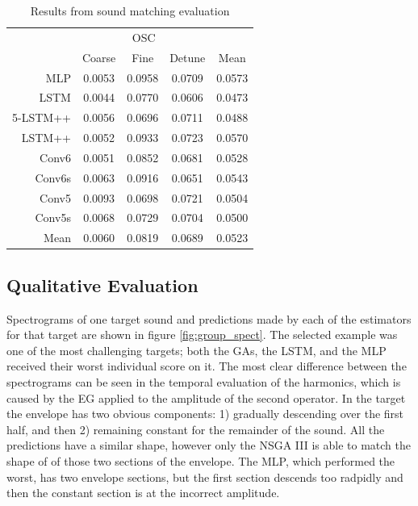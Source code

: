 \begin{table}[t]
\centering
\caption{Results from sound matching evaluation}
\label{tbl:param_eval_osc}
\begin{tabular}{r|ccc|c}
\toprule
{} & \multicolumn{3}{c}{OSC} & {} \\
{} & Coarse & Fine & Detune & Mean \\
\midrule
MLP      &    0.0053 &  0.0958 &      0.0709 & 0.0573 \\
LSTM     &    0.0044 &  0.0770 &      0.0606 & 0.0473 \\
5-LSTM++ &    0.0056 &  0.0696 &      0.0711 & 0.0488 \\
LSTM++   &    0.0052 &  0.0933 &      0.0723 & 0.0570 \\
Conv6    &    0.0051 &  0.0852 &      0.0681 & 0.0528 \\
Conv6s   &    0.0063 &  0.0916 &      0.0651 & 0.0543 \\
Conv5    &    0.0093 &  0.0698 &      0.0721 & 0.0504 \\
Conv5s   &    0.0068 &  0.0729 &      0.0704 & 0.0500 \\
\midrule
Mean     &    0.0060 &  0.0819 &      0.0689 & 0.0523 \\
\bottomrule
\end{tabular}
\end{table}

\subsection{Qualitative Evaluation}
Spectrograms of one target sound and predictions made by each of the estimators for that target are shown in figure \ref{fig:group_spect}. The selected example was one of the most challenging targets; both the GAs, the LSTM, and the MLP received their worst individual score on it. The most clear difference between the spectrograms can be seen in the temporal evaluation of the harmonics, which is caused by the EG applied to the amplitude of the second operator. In the target the envelope has two obvious components: 1) gradually descending over the first half, and then 2) remaining constant for the remainder of the sound. All the predictions have a similar shape, however only the NSGA III is able to match the shape of of those two sections of the envelope. The MLP, which performed the worst, has two envelope sections, but the first section descends too radpidly and then the constant section is at the incorrect amplitude.

